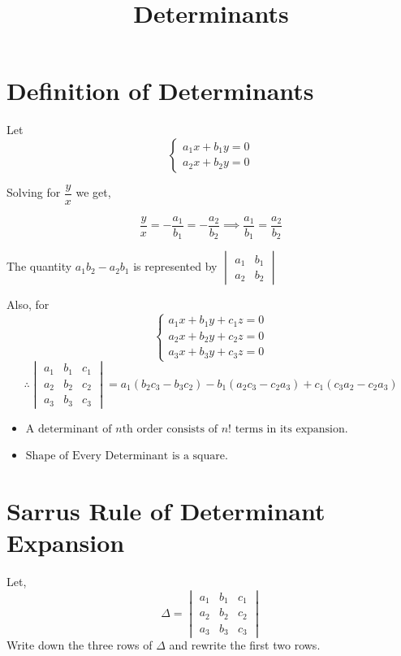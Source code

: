 \documentclass{article}
\title{Determinants}
\author{}
\date{}
\begin{document}
\maketitle

\section{Definition of Determinants}

Let\begin{equation*}
    \begin{cases}
        a_{1}x+b_{1}y=0 \\
    a_{2}x+b_{2}y=0
    \end{cases}
\end{equation*}

Solving for $\dfrac{y}{x}$ we get, 

$$\dfrac{y}{x}=-\dfrac{a_{1}}{b_{1}}=-\dfrac{a_{2}}{b_{2}} \implies \dfrac{a_{1}}{b_{1}}=\dfrac{a_{2}}{b_{2}}$$

The quantity $a_{1}b_{2}-a_{2}b_{1} $ is represented by $\begin{vmatrix}
    a_{1} & b_{1} \\
    a_{2} & b_{2}
\end{vmatrix}$

Also, for\begin{equation*}
    \begin{cases}
        a_{1}x+b_{1}y+c_{1}z=0 \\
        a_{2}x+b_{2}y+c_{2}z=0 \\
        a_{3}x+b_{3}y+c_{3}z=0
    \end{cases}
\end{equation*}
$$\therefore \begin{vmatrix}
    a_{1} & b_{1} & c_{1} \\
    a_{2} & b_{2}&c_{2} \\
    a_{3} &b_{3} &c_{3} 
\end{vmatrix}=a_{1}\left(b_{2}c_{3} - b_{3}c_{2} \right)-b_{1}\left(a_{2}c_{3}-c_{2}a_{3} \right)+c_{1}\left(c_{3}a_{2}-c_{2}a_{3} \right) $$

\begin{itemize}
    \item $\text{A determinant of $n$th order consists of $n!$ terms in its expansion.}$
    \item $\text{Shape of Every Determinant is a square.}$
\end{itemize}

\section{Sarrus Rule of Determinant Expansion}
Let, $$\Delta = \begin{vmatrix}
    a_{1} &b_{1} &c_{1} \\
     a_{2} &b_{2} &c_{2} \\
     a_{3} &b_{3} &c_{3}  
\end{vmatrix}$$
Write down the three rows of $\Delta$ and rewrite the first two rows. 
\end{document}
